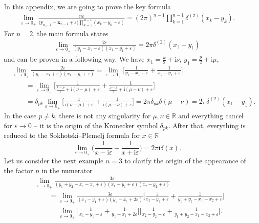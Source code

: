 \documentclass[10pt,a4paper]{amsart}
\renewcommand{\imath}{\mathrm{i}}
\numberwithin{equation}{section}
\begin{document}
In this appendix, we are going to prove
the key formula
\begin{align}\label{deltan}
\lim\limits_{\varepsilon\to 0_+}
\frac{n \varepsilon}
{\bigl(\underline{\bm{y}_{n-1}}-\underline{\bm{x}_{n-1}}+\varepsilon\bigr)
\prod_{k=1}^{n-1}(x_k-y_k+\varepsilon)} =
(2\pi)^{n-1} \prod\limits_{k=1}^{n-1}
\delta^{(2)}(x_k-y_k) .
\end{align}
For $n=2$, the main formula states
\begin{align*}
\lim\limits_{\varepsilon\to 0_+}
\frac{2\varepsilon}
{(y_1-x_1+\varepsilon)(x_1-y_1+\varepsilon)} =
2\pi \delta^{(2)}(x_1-y_1)
\end{align*}
and can be proven in a following way.
We have $x_1 = \tfrac{k}{2}+\imath\nu$,
$y_1 = \tfrac{p}{2}+\imath\mu$,
\begin{align*}
&
\lim\limits_{\varepsilon\to 0_+}
\frac{2\varepsilon}
{(y_1-x_1+\varepsilon)(x_1-y_1+\varepsilon)} =
\lim\limits_{\varepsilon\to 0_+}
\biggl[\frac{1}
{y_1-x_1+\varepsilon} +
\frac{1}
{x_1-y_1+\varepsilon}\biggr] \\
&\qquad =
\lim\limits_{\varepsilon\to 0_+}\biggl[
\frac{1}
{\tfrac{k-p}{2}+\imath(\nu-\mu)+\varepsilon}+
\frac{1}
{\tfrac{p-k}{2}+\imath(\mu-\nu)+\varepsilon}
\biggr] \\
&\qquad =
\delta_{p k}\lim\limits_{\varepsilon\to 0_+}\biggl[
\frac{1}
{\imath(\nu-\mu)+\varepsilon}+
\frac{1}
{\imath(\mu-\nu)+\varepsilon}
\biggr] =
2\pi \delta_{p k} \delta(\mu-\nu) =
2\pi \delta^{(2)}(x_1-y_1) .
\end{align*}
In the case $p \neq k$, there is not any singularity for $\mu,\nu \in \mathbb{R}$
and everything cancel for $\varepsilon \to 0$ -- it is the origin of the Kronecker symbol $\delta_{p k}$. After that, everything is reduced to the Sokhotski--Plemelj formula for $x\in \mathbb{R}$
\begin{equation*}
	\lim\limits_{\varepsilon\to 0_+}
	\biggl(\frac{1}{x -\imath\varepsilon}
	- \frac{1}{x +\imath\varepsilon}\biggr)
	= 2\pi\imath \delta(x) .
\end{equation*}
Let us consider the next example $n=3$ to clarify the origin
of the appearance of the factor $n$ in the numerator
\begin{align*}
&
\lim\limits_{\varepsilon\to 0_+}
\frac{3\varepsilon}
{(y_1+y_2-x_1-x_2+\varepsilon)(x_1-y_1+\varepsilon)(x_2-y_2+\varepsilon)} \\
&\qquad =
\lim\limits_{\varepsilon\to 0_+}
\frac{3\varepsilon}
{(x_1-y_1+\varepsilon)(y_1-x_1+2\varepsilon)}
\biggl[\frac{1}{x_2-y_2+\varepsilon}+\frac{1}{y_1+y_2-x_1-x_2+\varepsilon}
\biggr] \\
&\qquad =
\lim\limits_{\varepsilon\to 0_+}
\biggl[
\frac{1}
{x_1-y_1+\varepsilon}+
\frac{1}
{y_1-x_1+2\varepsilon}\biggr]
\biggl[\frac{1}{x_2-y_2+\varepsilon}+
\frac{1}{y_1+y_2-x_1-x_2+\varepsilon}
\biggr] .
\end{align*}
\end{document}
